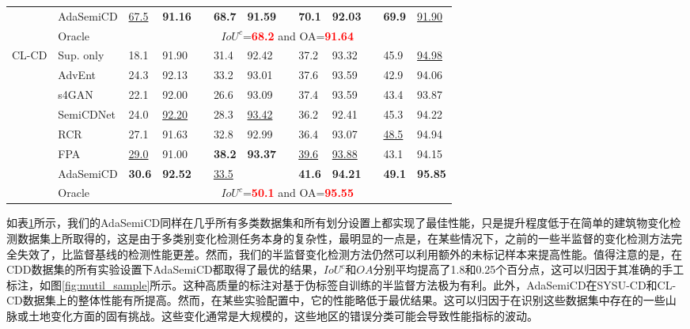 \documentclass[lang=chs, degree=master, blindreview=false, adobe=false]{yanputhesis}
\begin{document}
\begin{table}[H]
{\begin{tabular}{p{20mm}p{25mm}p{8mm}p{8mm}cp{8mm}p{8mm}cp{8mm}p{8mm}cp{8mm}p{8mm}}
      \rowcolor{mycyan}
      \multirow{-8}{*}{\cellcolor{white}}& \cellcolor{white}AdaSemiCD   &   \cellcolor{white}\underline{67.5} & \textbf{91.16} && \textbf{68.7} & \textbf{91.59} && \textbf{70.1} & \textbf{92.03} && \textbf{69.9} & \cellcolor{white}\underline{91.90} \\%
      \cline{2-13}
      & Oracle & \multicolumn{11}{c}{$ IoU^c$=\textcolor{red}{\bf 68.2} and OA=\textcolor{red}{\bf 91.64}} \\
      \bottomrule
      \multirow{8}{*}{CL-CD}
      & Sup. only   &   18.1 & 91.90 && 31.4 & 92.42 && 37.2 & 93.32 && 45.9 & \underline{94.98} \\ %
      & AdvEnt\cite{vu2019advent}& 24.3 & 92.13 && 33.2 & 93.01 && 37.6 & 93.59 && 42.9 & 94.06 \\ %
      & s4GAN\cite{mittal2019semi}& 22.1 & 92.00 && 26.6 & 93.09 && 37.4 & 93.59 && 43.4 & 93.87 \\
      & SemiCDNet\cite{peng2021SemiCDNet} & 24.0 & \underline{92.20} && 28.3 & \underline{93.42} && 36.2 & 92.41 && 45.3 & 94.22 \\ %
      & RCR\cite{bandara2022RCR}& 27.1 & 91.63 && 32.8 & 92.99 && 36.4 & 93.07 && \underline{48.5} & 94.94 \\
      & FPA\cite{Zhang2023FPA}& \underline{29.0} & 91.00 && \cellcolor{mycyan}\textbf{38.2} & \cellcolor{mycyan}\textbf{93.37} && \underline{39.6} & \underline{93.88} && 43.1 & 94.15 \\
      \rowcolor{mycyan}
      \multirow{-8}{*}{\cellcolor{white}}& \cellcolor{white}AdaSemiCD   &   \textbf{30.6} & \textbf{92.52} && \cellcolor{white}\underline{33.5} & \cellcolor{white}{92.40} && \textbf{41.6} & \textbf{94.21} && \textbf{49.1} & \textbf{95.85} \\%
      \cline{2-13}
      & Oracle & \multicolumn{11}{c}{$ IoU^c$=\textcolor{red}{\bf 50.1} and OA=\textcolor{red}{\bf 95.55}} \\
      \bottomrule
  \end{tabular}
  }
  \label{tab:Ada-mutil}
\end{table}

如表\ref{tab:Ada-mutil}所示，我们的AdaSemiCD同样在几乎所有多类数据集和所有划分设置上都实现了最佳性能，只是提升程度低于在简单的建筑物变化检测数据集上所取得的，这是由于多类别变化检测任务本身的复杂性，最明显的一点是，在某些情况下，之前的一些半监督的变化检测方法完全失效了，比监督基线的检测性能更差。然而，我们的半监督变化检测方法仍然可以利用额外的未标记样本来提高性能。值得注意的是，在CDD数据集的所有实验设置下AdaSemiCD都取得了最优的结果，$IoU^c$和$OA$分别平均提高了1.8和0.25个百分点，这可以归因于其准确的手工标注，如图\ref{fig:mutil_sample}所示。这种高质量的标注对基于伪标签自训练的半监督方法极为有利。此外，AdaSemiCD在SYSU-CD和CL-CD数据集上的整体性能有所提高。然而，在某些实验配置中，它的性能略低于最优结果。这可以归因于在识别这些数据集中存在的一些山脉或土地变化方面的固有挑战。这些变化通常是大规模的，这些地区的错误分类可能会导致性能指标的波动。
\end{document}
